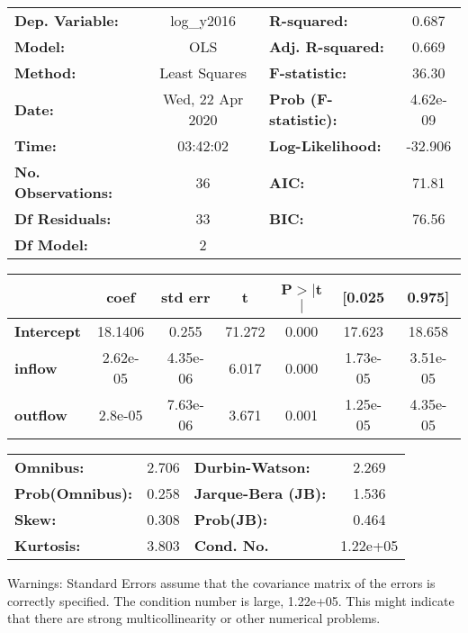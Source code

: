\begin{center}
\begin{tabular}{lclc}
\toprule
\textbf{Dep. Variable:}    &    log\_y2016    & \textbf{  R-squared:         } &     0.687   \\
\textbf{Model:}            &       OLS        & \textbf{  Adj. R-squared:    } &     0.669   \\
\textbf{Method:}           &  Least Squares   & \textbf{  F-statistic:       } &     36.30   \\
\textbf{Date:}             & Wed, 22 Apr 2020 & \textbf{  Prob (F-statistic):} &  4.62e-09   \\
\textbf{Time:}             &     03:42:02     & \textbf{  Log-Likelihood:    } &   -32.906   \\
\textbf{No. Observations:} &          36      & \textbf{  AIC:               } &     71.81   \\
\textbf{Df Residuals:}     &          33      & \textbf{  BIC:               } &     76.56   \\
\textbf{Df Model:}         &           2      & \textbf{                     } &             \\
\bottomrule
\end{tabular}
\begin{tabular}{lcccccc}
                   & \textbf{coef} & \textbf{std err} & \textbf{t} & \textbf{P$> |$t$|$} & \textbf{[0.025} & \textbf{0.975]}  \\
\midrule
\textbf{Intercept} &      18.1406  &        0.255     &    71.272  &         0.000        &       17.623    &       18.658     \\
\textbf{inflow}    &     2.62e-05  &     4.35e-06     &     6.017  &         0.000        &     1.73e-05    &     3.51e-05     \\
\textbf{outflow}   &      2.8e-05  &     7.63e-06     &     3.671  &         0.001        &     1.25e-05    &     4.35e-05     \\
\bottomrule
\end{tabular}
\begin{tabular}{lclc}
\textbf{Omnibus:}       &  2.706 & \textbf{  Durbin-Watson:     } &    2.269  \\
\textbf{Prob(Omnibus):} &  0.258 & \textbf{  Jarque-Bera (JB):  } &    1.536  \\
\textbf{Skew:}          &  0.308 & \textbf{  Prob(JB):          } &    0.464  \\
\textbf{Kurtosis:}      &  3.803 & \textbf{  Cond. No.          } & 1.22e+05  \\
\bottomrule
\end{tabular}
\end{center}

Warnings: \newline
 [1] Standard Errors assume that the covariance matrix of the errors is correctly specified. \newline
 [2] The condition number is large, 1.22e+05. This might indicate that there are \newline
 strong multicollinearity or other numerical problems.
